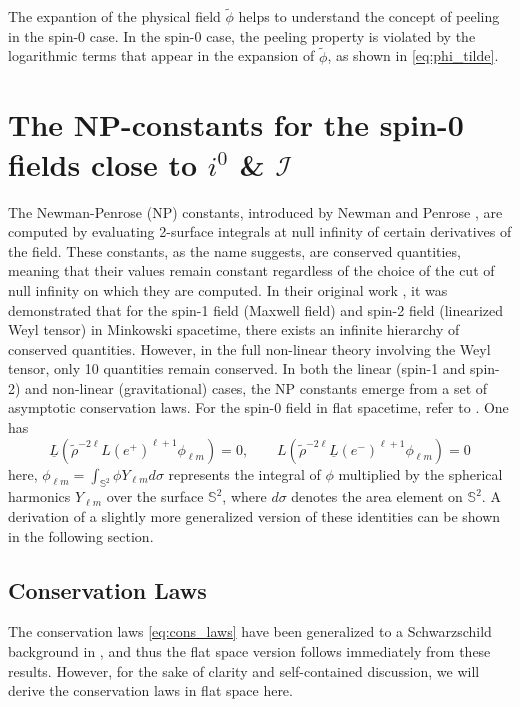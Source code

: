 The expantion of the physical field $\tilde{\phi}$ helps to understand the concept of peeling in the spin-0 case. In the spin-0 case, the peeling property is violated by the logarithmic terms that appear in the expansion of $\tilde{\phi}$, as shown in \eqref{eq:phi_tilde}.
\chapter{The NP-constants for the spin-0 fields close to $i^0$ \& $\mathscr{I}$}
\label{chapter:NPConstants}


The Newman-Penrose (NP) constants, introduced by Newman and Penrose \cite{NewPen68}, are computed by evaluating 2-surface integrals at null infinity of certain derivatives of the field. These constants, as the name suggests, are conserved quantities, meaning that their values remain constant regardless of the choice of the cut of null infinity on which they are computed. In their original work \cite{NewPen68}, it was demonstrated that for the spin-1 field (Maxwell field) and spin-2 field (linearized Weyl tensor) in Minkowski spacetime, there exists an infinite hierarchy of conserved quantities. However, in the full non-linear theory involving the Weyl tensor, only 10 quantities remain conserved. In both the linear (spin-1 and spin-2) and non-linear (gravitational) cases, the NP constants emerge from a set of asymptotic conservation laws. For the spin-0 field in flat spacetime, refer to \cite{Keh21_a}. One has
\begin{equation}\label{eq:cons_laws}
  {\underline{{L}}}({\tilde{\rho}}^{-2\ell}L(e^{+})^{\ell+1}\phi_{\ell m})=0, \qquad L({\tilde{\rho}}^{-2\ell}\underline{L}(e^{-})^{\ell+1}\phi_{\ell m})=0
\end{equation}
here, $\phi_{\ell m}= \int_{\mathbb{S}^2} \phi  Y_{\ell m}  d\sigma$ represents the integral of $\phi$ multiplied by the spherical harmonics $Y_{\ell m}$ over the surface $\mathbb{S}^2$, where $d\sigma$ denotes the area element on $\mathbb{S}^2$. A derivation of a slightly more generalized version of these identities can be shown in the following section.

\section{Conservation Laws}
\label{sec:conservationlaws}

The conservation laws \eqref{eq:cons_laws} have been generalized to a Schwarzschild background in \cite{Keh21_a}, and thus the flat space version follows immediately from these results. However, for the sake of clarity and self-contained discussion, we will derive the conservation laws in flat space here.

